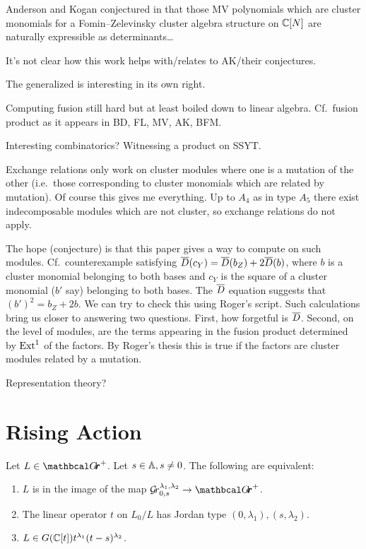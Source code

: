 \documentclass[draft]{article}
\begin{document}
Anderson and Kogan conjectured in \cite{anderson2006algebra}  that those MV polynomials which are cluster monomials for a Fomin--Zelevinsky cluster algebra structure on $\CC[N]$ are naturally expressible as determinants\dots

It's not clear how this work helps with/relates to AK/their conjectures.

The generalized \mvy is interesting in its own right. 

Computing fusion still hard but at least boiled down to linear algebra. Cf.\ fusion product as it appears in BD, FL, MV, AK, BFM.

Interesting combinatorics? Witnessing a product on SSYT.

Exchange relations only work on cluster modules where one is a mutation of the other (i.e.\ those corresponding to cluster monomials which are related by mutation). Of course this gives me everything. Up to $A_4$ as in type $A_5$ there exist indecomposable modules which are not cluster, so exchange relations do not apply. 

The hope (conjecture) is that this paper gives a way to compute on such modules. Cf.\ counterexample satisfying $\barD(c_Y) = \barD(b_Z) + 2\barD(b)$, where $b$ is a cluster monomial belonging to both bases and $c_Y$ is the square of a cluster monomial ($b'$ say) belonging to both bases. The $\barD$ equation suggests that $(b')^2 = b_Z + 2b$. We can try to check this using Roger's script. Such calculations bring us closer to answering two questions. First, how forgetful is $\barD$. Second, on the level of modules, are the terms appearing in the fusion product determined by $\Ext^1$ of the factors. By Roger's thesis this is true if the factors are cluster modules related by a mutation. 


Representation theory? 

\section{Rising Action} %

\begin{lemma} \label{le:Grl1l2}
    Let $ L \in \Grth^+ $.  Let $ s \in \AA, s \ne 0 $.  The following are equivalent:
    \begin{enumerate}
        \item $ L $ is in the image of the map $ \Gr^{\lambda_1, \lambda_2}_{0,s} \rightarrow \Grth^+$.
        \item The linear operator $ t $ on $ L_0/L$ has Jordan type $(0,\lambda_1), (s,\lambda_2)$.
        \item $ L \in G(\CC[t]) t^{\lambda_1} (t-s)^{\lambda_2}$.
    \end{enumerate}
\end{lemma}
\end{document}

